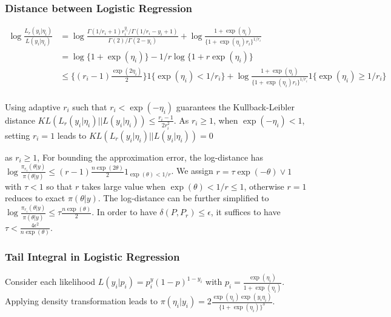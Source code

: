 \documentclass[10pt]{article}
\begin{document}
\subsubsection{Distance between Logistic Regression}
\begin{equation}
\begin{aligned}
\log \frac{ L_{r}(y_i|\eta_i) }{L(y_i|\eta_i)} & =\log \frac{\Gamma(1/r_i+1) r_i^{y_i}  /\Gamma(1/r_i -y_i+1)  }{\Gamma(2) /\Gamma(2 -y_i)  } + \log \frac{ 1+\exp(\eta_i)}{ \{1+\exp(\eta_i)r_i\}^{1/r_i}}\\
& =\log\{1+ \exp ( \eta_i)\}   - 1/r \log\{1+ r\exp ( \eta_i)\}\\
& \le   \{   (r_i-1) \frac{ \exp(2\eta_i)}{2} \}  1\{\exp(\eta_i)< 1/r_i\} + \log \frac{ 1+\exp(\eta_i)}{ \{1+\exp(\eta_i)r_i\}^{1/r_i}}  1\{\exp(\eta_i)\ge 1/r_i\} \\
\end{aligned}
\end{equation}

Using adaptive $r_i$ such that $r_i <\exp(-\eta_i)$ guarantees the Kullback-Leibler distance $KL ( { L_{r}(y_i|\eta_i) } || {L(y_i|\eta_i)} ) \le \frac{r_i-1}{2 r_i^2} $. As $r_i\ge 1$, when $\exp(-\eta_i) < 1$, setting $r_i=1$ leads to $KL ( { L_{r}(y_i|\eta_i) } || {L(y_i|\eta_i)} ) =0 $



as $r_i\ge 1$, For bounding the approximation error, the log-distance has $\log\frac{\pi_{r_i}(\theta|y)}{\pi(\theta|y)} \le     (r-1) \frac{n \exp(2\theta)}{2}   1_{\exp(\theta)< 1/r}$. We assign $r= {\tau}{ \exp(-\theta)} \vee 1$ with $\tau<1$ so that $r$ takes large value when  $\exp(\theta)< 1/r \le 1$, otherwise $r=1$ reduces to exact $\pi(\theta|y)$. The log-distance can be further simplified to $\log\frac{\pi_{r_i}(\theta|y)}{\pi(\theta|y)}\le \tau\frac{n\exp(\theta)}{2}$. In order to have $\delta(P,P_r)\le\epsilon$, it suffices to have $\tau< \frac{4\epsilon^2}{n\exp(\theta)}$.

\subsubsection{Tail Integral in Logistic Regression}

Consider each likelihood $L(y_i|p_i) = p^y_i (1-p)^{1-y_i}$ with $p_i=\frac{\exp(\eta_i)}{1+\exp(\eta_i)}$. Applying density transformation leads to 
$\pi(\eta_i|y_i) = 2\frac{\exp(\eta_i) \exp(y_i\eta_i)}{\{1+\exp(\eta_i)\}^3}$.
\end{document}
